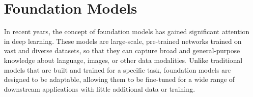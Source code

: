 





\section{Foundation Models}

In recent years, the concept of foundation models has gained significant attention in deep learning. These models are large-scale, pre-trained networks trained on vast and diverse datasets, so that they can capture broad and general-purpose knowledge about language, images, or other data modalities. Unlike traditional models that are built and trained for a specific task, foundation models are designed to be adaptable, allowing them to be fine-tuned for a wide range of downstream applications with little additional data or training.

